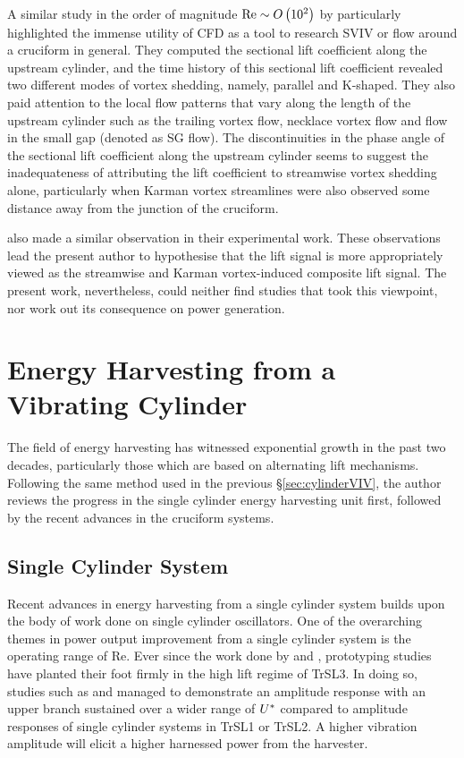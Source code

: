 \documentclass[oneside]{utmthesis}
\begin{document}
A similar study in the order of magnitude $\text{Re} \sim O \left( 10^{2} \right)$ by \citet{Zhao2018a} particularly highlighted the immense utility of CFD as a tool to research SVIV or flow around a cruciform in general. They computed the sectional lift coefficient along the upstream cylinder, and the time history of this sectional lift coefficient revealed two different modes of vortex shedding, namely, parallel and K-shaped. They also paid attention to the local flow patterns that vary along the length of the upstream cylinder such as the trailing vortex flow, necklace vortex flow and flow in the small gap (denoted as SG flow). The discontinuities in the phase angle of the sectional lift coefficient along the upstream cylinder seems to suggest the inadequateness of attributing the lift coefficient to streamwise vortex shedding alone, particularly when Karman vortex streamlines were also observed some distance away from the junction of the cruciform.

\citet{Shirakashi1989} also made a similar observation in their experimental work. These observations lead the present author to hypothesise that the lift signal is more appropriately viewed as the streamwise and Karman vortex-induced composite lift signal. The present work, nevertheless, could neither find studies that took this viewpoint, nor work out its consequence on power generation.

\section{Energy Harvesting from a Vibrating Cylinder} \label{sec:energyHarvesting}
The field of energy harvesting has witnessed exponential growth in the past two decades, particularly those which are based on alternating lift mechanisms. Following the same method used in the previous \S\ref{sec:cylinderVIV}, the author reviews the progress in the single cylinder energy harvesting unit first, followed by the recent advances in the cruciform systems.

\subsection{Single Cylinder System} \label{ssec:singleCylinderHarvester}
Recent advances in energy harvesting from a single cylinder system builds upon the body of work done on single cylinder oscillators. One of the overarching themes in power output improvement from a single cylinder system is the operating range of Re. Ever since the work done by \citet{Bernitsas2008a} and \citet{Bernitsas2009}, prototyping studies have planted their foot firmly in the high lift regime of TrSL3. In doing so, studies such as \citet{Ding2019} and \citet{Park2017} managed to demonstrate an amplitude response with an upper branch sustained over a wider range of $U^{*}$ compared to amplitude responses of single cylinder systems in TrSL1 or TrSL2. A higher vibration amplitude will elicit a higher harnessed power from the harvester.
\end{document}
